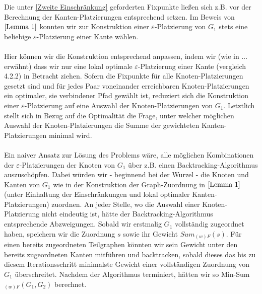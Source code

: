 \documentclass[a4paper, 12pt, twoside]{article}
\theoremstyle{Format1} %
\begin{document}
Die unter \ref{Zweite Einschränkung} geforderten Fixpunkte ließen sich z.B. vor der Berechnung der Kanten-Platzierungen entsprechend setzen.
Im Beweis von $\ref{Lemma 1}$ konnten wir zur Konstruktion einer $\varepsilon$-Platzierung von $G_1$ stets eine beliebige $\varepsilon$-Platzierung einer Kante wählen.
\\
\\
Hier können wir die Konstruktion entsprechend anpassen, indem wir (wie in ... erwähnt) dass wir nur eine lokal optimale $\varepsilon$-Platzierung einer Kante (vergleich 4.2.2) in Betracht ziehen.
Sofern die Fixpunkte für alle Knoten-Platzierungen gesetzt sind und für jedes Paar voneinander erreichbaren Knoten-Platzierungen ein optimaler, sie verbindener Pfad gewählt ist,
reduziert sich die Konstruktion einer $\varepsilon$-Platzierung auf eine Auswahl der Knoten-Platzierungen von $G_1$.
Letztlich stellt sich in Bezug auf die Optimalität die Frage, unter welcher möglichen Auswahl der Knoten-Platzierungen die Summe der gewichteten Kanten-Platzierungen minimal wird.
\\
\\
Ein naiver Ansatz zur Lösung des Problems wäre, alle möglichen Kombinationen der $\varepsilon$-Platzierungen der Knoten von $G_1$ über z.B. einen Backtracking-Algorithmus auszuschöpfen.
Dabei würden wir - beginnend bei der Wurzel - die Knoten und Kanten von $G_1$ wie in der Konstruktion der Graph-Zuordnung in $\ref{Lemma 1}$ (unter Einhaltung der Einschränkungen
und lokal optimaler Kanten-Platzierungen) zuordnen.
An jeder Stelle, wo die Auswahl einer Knoten-Platzierung nicht eindeutig ist, hätte der Backtracking-Algorithmus entsprechende Abzweigungen.
Sobald wir erstmalig $G_1$ vollständig zugeordnet haben, speichern wir die Zuordnung $s$ sowie ihr Gewicht $Sum_{(w)F}(s)$.
Für einen bereits zugeordneten Teilgraphen könnten wir sein Gewicht unter den bereits zugeordneten Kanten mitführen und backtracken, sobald dieses das bis zu diesem Iterationsschritt
minimalste Gewicht einer vollständigen Zuordnung von $G_1$ überschreitet. Nachdem der Algorithmus terminiert, hätten wir so Min-Sum$_{(w)F}(G_1,G_2)$ berechnet.
\end{document}
